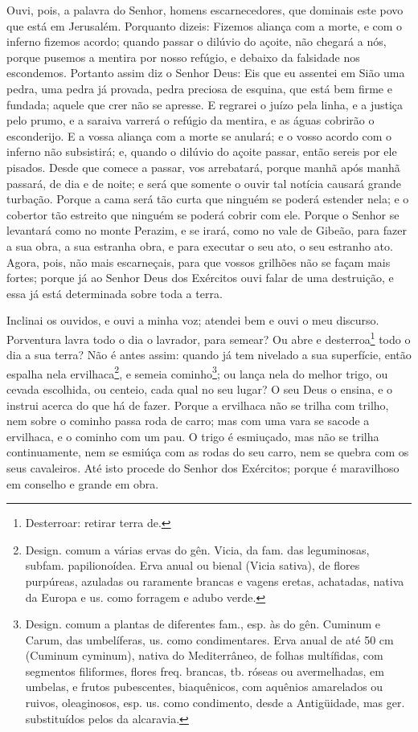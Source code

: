 Ouvi, pois, a palavra do Senhor, homens escarnecedores, que
dominais este povo que está em Jerusalém. Porquanto dizeis:
Fizemos aliança com a morte, e com o inferno fizemos acordo; quando
passar o dilúvio do açoite, não chegará a nós, porque pusemos a
mentira por nosso refúgio, e debaixo da falsidade nos escondemos.
Portanto assim diz o Senhor Deus: Eis que eu assentei em Sião
uma pedra, uma pedra já provada, pedra preciosa de esquina, que está
bem firme e fundada; aquele que crer não se apresse. E
regrarei o juízo pela linha, e a justiça pelo prumo, e a saraiva
varrerá o refúgio da mentira, e as águas cobrirão o esconderijo.
E a vossa aliança com a morte se anulará; e o vosso acordo
com o inferno não subsistirá; e, quando o dilúvio do açoite passar,
então sereis por ele pisados. Desde que comece a passar, vos
arrebatará, porque manhã após manhã passará, de dia e de noite; e
será que somente o ouvir tal notícia causará grande turbação.
Porque a cama será tão curta que ninguém se poderá estender
nela; e o cobertor tão estreito que ninguém se poderá cobrir com
ele. Porque o Senhor se levantará como no monte Perazim, e se
irará, como no vale de Gibeão, para fazer a sua obra, a sua estranha
obra, e para executar o seu ato, o seu estranho ato. Agora,
pois, não mais escarneçais, para que vossos grilhões não se façam
mais fortes; porque já ao Senhor Deus dos Exércitos ouvi falar de
uma destruição, e essa já está determinada sobre toda a terra.

Inclinai os ouvidos, e ouvi a minha voz; atendei bem e ouvi o meu
discurso. Porventura lavra todo o dia o lavrador, para
semear? Ou abre e desterroa\footnote{Desterroar: retirar terra de.}
todo o dia a sua terra? Não é antes assim: quando já tem
nivelado a sua superfície, então espalha nela
ervilhaca\footnote{Design. comum a várias ervas do gên. Vicia, da
fam. das leguminosas, subfam. papilionoídea. Erva anual ou bienal
(Vicia sativa), de flores purpúreas, azuladas ou raramente brancas e
vagens eretas, achatadas, nativa da Europa e us. como forragem e
adubo verde.}, e semeia cominho\footnote{Design. comum a plantas de
diferentes fam., esp. às do gên. Cuminum e Carum, das umbelíferas,
us. como condimentares. Erva anual de até 50 cm (Cuminum cyminum),
nativa do Mediterrâneo, de folhas multífidas, com segmentos
filiformes, flores freq. brancas, tb. róseas ou avermelhadas, em
umbelas, e frutos pubescentes, biaquênicos, com aquênios amarelados
ou ruivos, oleaginosos, esp. us. como condimento, desde a
Antigüidade, mas ger. substituídos pelos da alcaravia.}; ou lança
nela do melhor trigo, ou cevada escolhida, ou centeio, cada qual no
seu lugar? O seu Deus o ensina, e o instrui acerca do que há
de fazer. Porque a ervilhaca não se trilha com trilho, nem
sobre o cominho passa roda de carro; mas com uma vara se sacode a
ervilhaca, e o cominho com um pau. O trigo é esmiuçado, mas
não se trilha continuamente, nem se esmiúça com as rodas do seu
carro, nem se quebra com os seus cavaleiros. Até isto procede
do Senhor dos Exércitos; porque é maravilhoso em conselho e grande
em obra.

